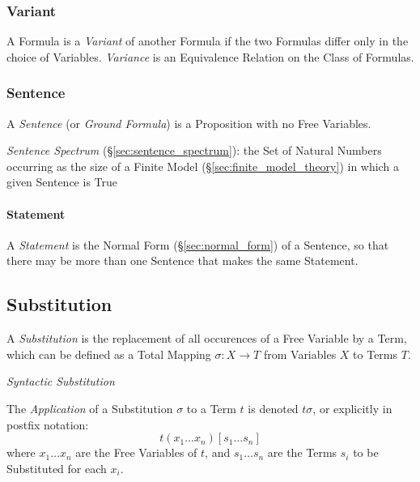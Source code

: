 \subsubsection{Variant}\label{sec:variant}

A Formula is a \emph{Variant} of another Formula if the two Formulas
differ only in the choice of Variables. \emph{Variance} is an
Equivalence Relation on the Class of Formulas.



\subsubsection{Sentence}\label{sec:sentence}

A \emph{Sentence} (or \emph{Ground Formula}) is a Proposition with no
Free Variables.

\emph{Sentence Spectrum} (\S\ref{sec:sentence_spectrum}): the Set of Natural
Numbers occurring as the size of a Finite Model
(\S\ref{sec:finite_model_theory}) in which a given Sentence is True



\paragraph{Statement}\label{sec:statement}\hfill

A \emph{Statement} is the Normal Form (\S\ref{sec:normal_form}) of a
Sentence, so that there may be more than one Sentence that makes the
same Statement.



\subsection{Substitution}\label{sec:substitution}

A \emph{Substitution} is the replacement of all occurences of a Free
Variable by a Term, which can be defined as a Total Mapping $\sigma: X
\rightarrow T$ from Variables $X$ to Terms $T$.

\emph{Syntactic Substitution}

The \emph{Application} of a Substitution $\sigma$ to a Term $t$ is
denoted $t\sigma$, or explicitly in postfix notation:
\[
  t(x_1 \ldots x_n)[s_1 \ldots s_n]
\]
where $x_1 \ldots x_n$ are the Free Variables of $t$, and $s_1 \ldots
s_n$ are the Terms $s_i$ to be Substituted for each $x_i$.


